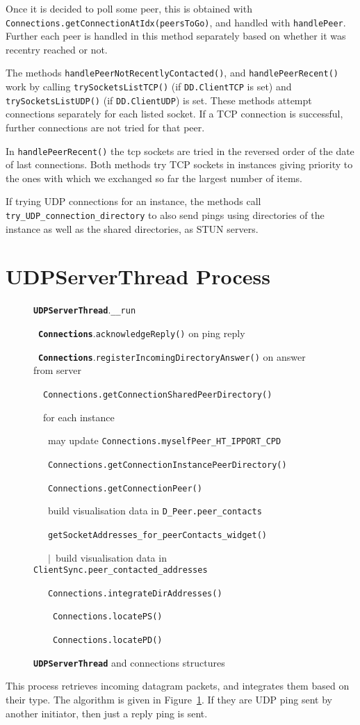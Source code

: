 \documentclass{book}
\newcommand{\cls}[1]{{\tt\bf #1}}
\newcommand{\mth}[1]{{\tt #1}}
\newcommand{\mmb}[1]{{\tt #1}}
\begin{document}
Once it is decided to poll some peer, this is obtained with \mth{Connections.getConnectionAtIdx(peersToGo)},
and handled with \mth{handlePeer}. Further each peer is handled in this method separately based on whether it was
recentry reached or not.

The methods \mth{handlePeerNotRecentlyContacted()}, and \mth{handlePeerRecent()} work by calling 
\mth{trySocketsListTCP()} (if \mmb{DD.ClientTCP} is set) and \mth{trySocketsListUDP()} (if \mmb{DD.ClientUDP})
is set. 
These methods attempt connections separately for each listed socket. 
If a TCP connection is successful, further connections are not tried for that peer.

In \mth{handlePeerRecent()}  the tcp sockets
are tried in the reversed order of the date of last connections. 
Both methods try TCP sockets in instances giving priority to the ones with which we exchanged
so far the largest number of items.

If trying UDP connections for an instance, the methods call \mth{try\_UDP\_connection\_directory} to also 
send pings using directories of the instance as well as the shared directories, as STUN servers.

\section{UDPServerThread Process}

\begin{figure}[!ht]
\noindent
\strut\cls{UDPServerThread}.\mth{\_\_run} \\
\strut~\cls{Connections}.\mth{acknowledgeReply()} on ping reply\\
\strut~\cls{Connections}.\mth{registerIncomingDirectoryAnswer()} on answer from server\\
\strut~~\mth{Connections.getConnectionSharedPeerDirectory()}\\
\strut~~for each instance\\
\strut~~~may update \mth{Connections.myselfPeer\_HT\_IPPORT\_CPD}\\
\strut~~~\mth{Connections.getConnectionInstancePeerDirectory()}\\
\strut~~~\mth{Connections.getConnectionPeer()} \\
\strut~~~build visualisation data in \mmb{D\_Peer.peer\_contacts} \\
\strut~~~\mth{getSocketAddresses\_for\_peerContacts\_widget()} \\
\strut~~~$|$~build visualisation data in \mmb{ClientSync.peer\_contacted\_addresses} \\
\strut~~~\mth{Connections.integrateDirAddresses()} \\
\strut~~~~\mth{Connections.locatePS()} \\
\strut~~~~\mth{Connections.locatePD()} \\
\caption{\cls{UDPServerThread} and connections structures}\label{fig:conn_udpserver}
\end{figure}
This process retrieves incoming datagram packets, and integrates them based on their type. The
algorithm is given in Figure~\ref{fig:conn_udpserver}.
If they are UDP ping sent by another initiator, then just a reply ping is sent.
\end{document}
